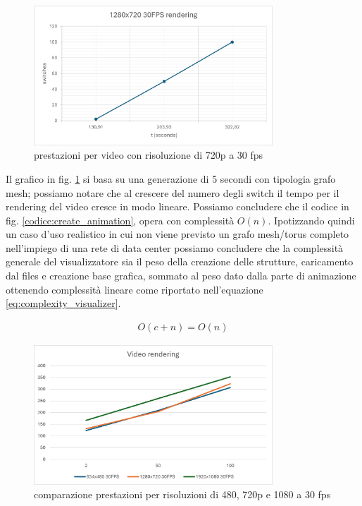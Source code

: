 \documentclass[binding=0.6cm]{sapthesis}
\begin{document}
\begin{figure}[h]
    \centering
    \includegraphics[width=0.8\textwidth]{immagini/720p_rendering_performance.png}
    \caption{prestazioni per video con risoluzione di 720p a 30 fps}
    \label{fig:720p_rendering_performance}
\end{figure}

Il grafico in fig. \ref{fig:720p_rendering_performance} si basa su una generazione di 5 secondi con tipologia grafo mesh; possiamo notare che al
crescere del numero degli switch il tempo per il rendering del video cresce in modo lineare. Possiamo concludere che il codice in fig. \ref{codice:create_animation}, opera con 
complessità \(O(n)\). Ipotizzando quindi un caso d'uso realistico in cui non viene previsto un grafo mesh/torus completo nell'impiego di una rete di data center
possiamo concludere che la complessità generale del visualizzatore sia il peso della creazione delle strutture, caricamento dal files e creazione base grafica, sommato 
al peso dato dalla parte di animazione ottenendo complessità lineare come riportato nell'equazione \ref{eq:complexity_visualizer}.

\begin{align}
    O(c + n) = O(n)
    \label{eq:complexity_visualizer}
\end{align}



\begin{figure}[h]
    \centering
    \includegraphics[width=0.8\textwidth]{immagini/480_720_1080_rend_perf.png}
    \caption{comparazione prestazioni per risoluzioni di 480, 720p e 1080 a 30 fps}
    \label{fig:480_720_1080_rend_perf}
\end{figure}
\end{document}
